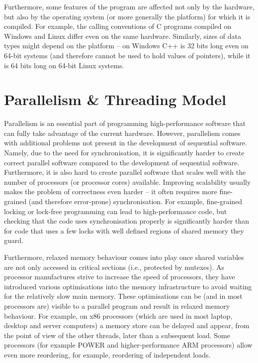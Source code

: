 Furthermore, some features of the program are affected not only by the
hardware, but also by the operating system (or more generally the platform) for
which it is compiled.
For example, the calling conventions of C programs compiled on Windows and
Linux differ even on the same hardware.
Similarly, sizes of data types might depend on the platform -- on Windows C++  is 32 bits long even on 64-bit systems (and therefore cannot be used
to hold values of pointers), while it is 64 bits long on 64-bit Linux systems.


\section{Parallelism \& Threading Model} %

Parallelism is an essential part of programming high-performance software that
can fully take advantage of the current hardware.
However, parallelism comes with additional problems not present in the development of sequential software.
Namely, due to the need for synchronisation, it is significantly harder to
create correct parallel software compared to the development of sequential
software.
Furthermore, it is also hard to create parallel software that scales well with
the number of processors (or processor cores) available.
Improving scalability usually makes the problem of correctness even harder --
it often requires more fine-grained (and therefore error-prone)
synchronisation.
For example, fine-grained locking or lock-free programming can lead to
high-performance code, but checking that the code uses synchronisation properly
is significantly harder than for code that uses a few locks with well defined
regions of shared memory they guard.

Furthermore, relaxed memory behaviour comes into play once shared variables are
not only accessed in critical sections (i.e., protected by mutexes).
As processor manufactures strive to increase the speed of processors, they have
introduced various optimisations into the memory infrastructure to avoid
waiting for the relatively slow main memory.
These optimisations can be (and in most processors are) visible to a parallel
program and result in relaxed memory behaviour.
For example, on x86 processors (which are used in most laptop, desktop and
server computers) a memory store can be delayed and appear, from the point of
view of the other threads, later than a subsequent load.
Some processors (for example POWER and higher-performance ARM processors) allow
even more reordering, for example, reordering of independent loads.

